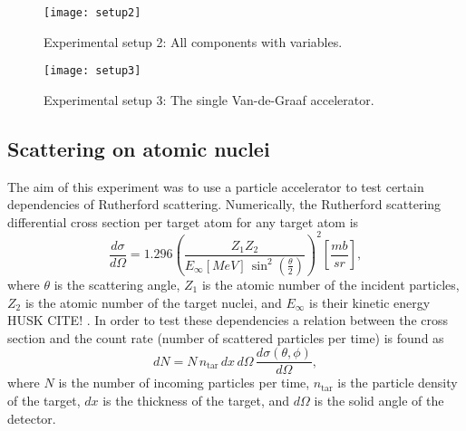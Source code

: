 \begin{figure}[h]
\centering
\texttt{[image: setup2]}
\caption{Experimental setup 2: All components with variables.}
\label{fig_setup2}
\end{figure}

\begin{figure}[h]
\centering
\texttt{[image: setup3]}
\caption{Experimental setup 3: The single Van-de-Graaf accelerator.}
\label{fig_setup3}
\end{figure}

\subsection{Scattering on atomic nuclei}
The aim of this experiment was to use a particle accelerator to test certain dependencies of Rutherford scattering. Numerically, the Rutherford scattering differential cross section per target atom for any target atom is
\begin{equation}
\frac{d\sigma}{d\Omega} = 1.296 \left( \frac{Z_1 Z_2}{E_\infty [MeV] \, \sin^2 \left(\frac{\theta}{2} \right) }\right)^2\left[\frac{mb}{sr}\right],
\end{equation}
where $\theta$ is the scattering angle, $Z_1$  is the atomic number of the incident particles, $Z_2$ is the atomic number of the target nuclei, and $E_{\infty}$ is their kinetic energy HUSK CITE!%
. 
In order to test these dependencies a relation between the cross section and the count rate (number of scattered particles per time) is found as
\begin{equation}
dN = N \, n_{\text{tar}} \, dx \,d\Omega \, \frac{d\sigma(\theta,\phi)}{d\Omega},
\end{equation}
where $N$ is the number of incoming particles per time, $n_\text{tar}$ is the particle density of the target, $dx$ is the thickness of the target, and $d\Omega$ is the solid angle of the detector.



